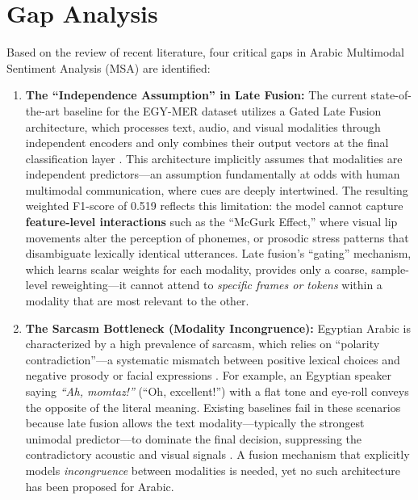 \documentclass[12pt, a4paper]{article}
\begin{document}

\section{Gap Analysis}\label{sec:gap}

Based on the review of recent literature, four critical gaps in Arabic Multimodal Sentiment Analysis (MSA) are identified:

\begin{enumerate}
    \item \textbf{The ``Independence Assumption'' in Late Fusion:} The current state-of-the-art baseline for the EGY-MER dataset utilizes a Gated Late Fusion architecture, which processes text, audio, and visual modalities through independent encoders and only combines their output vectors at the final classification layer \citep{Hussein2025}. This architecture implicitly assumes that modalities are independent predictors---an assumption fundamentally at odds with human multimodal communication, where cues are deeply intertwined. The resulting weighted F1-score of 0.519 reflects this limitation: the model cannot capture \textbf{feature-level interactions} such as the ``McGurk Effect,'' where visual lip movements alter the perception of phonemes, or prosodic stress patterns that disambiguate lexically identical utterances. Late fusion's ``gating'' mechanism, which learns scalar weights for each modality, provides only a coarse, sample-level reweighting---it cannot attend to \textit{specific frames or tokens} within a modality that are most relevant to the other.

    \item \textbf{The Sarcasm Bottleneck (Modality Incongruence):} Egyptian Arabic is characterized by a high prevalence of sarcasm, which relies on ``polarity contradiction''---a systematic mismatch between positive lexical choices and negative prosody or facial expressions \citep{Rahma2023}. For example, an Egyptian speaker saying \textit{``Ah, momtaz!''} (``Oh, excellent!'') with a flat tone and eye-roll conveys the opposite of the literal meaning. Existing baselines fail in these scenarios because late fusion allows the text modality---typically the strongest unimodal predictor---to dominate the final decision, suppressing the contradictory acoustic and visual signals \citep{Alqarafi2019}. A fusion mechanism that explicitly models \textit{incongruence} between modalities is needed, yet no such architecture has been proposed for Arabic.


\end{enumerate}
\end{document}
